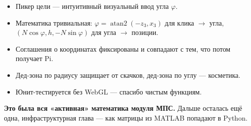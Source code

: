 \begin{itemize}
  \item Пикер цели --- интуитивный визуальный ввод угла $\varphi$.
  \item Математика тривиальная: $\varphi = \operatorname{atan2}(-z_3, x_3)$
        для клика $\to$ угла, $(N\cos\varphi, h, -N\sin\varphi)$ для угла $\to$ позиции.
  \item Соглашения о координатах фиксированы и совпадают с тем, что
        потом получает Pi.
  \item Дед-зона по радиусу защищает от скачков, дед-зона по углу
        --- косметика.
  \item Юнит-тестируется без WebGL --- спасибо чистым функциям.
\end{itemize}

\medskip
\textbf{Это была вся «активная» математика модуля МПС.} Дальше осталась
ещё одна, инфраструктурная глава --- как матрицы из MATLAB попадают
в Python.
